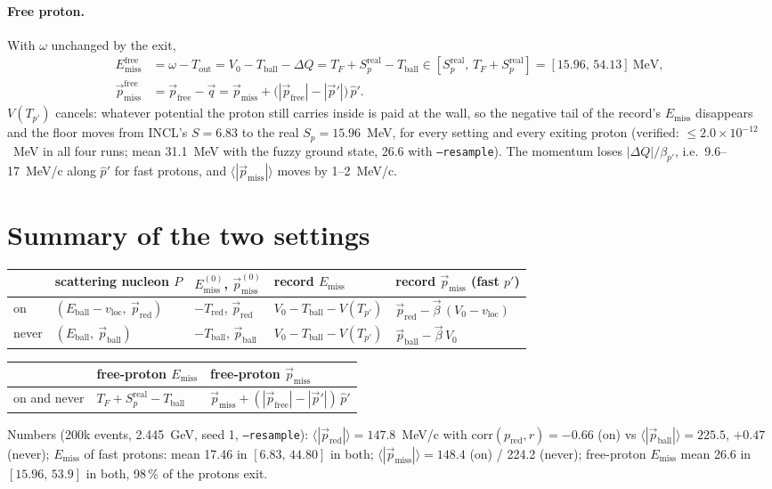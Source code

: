 \documentclass[11pt]{article}
\newcommand{\vv}[1]{\vec{#1}}
\newcommand{\ball}{\mathrm{ball}}
\newcommand{\red}{\mathrm{red}}
\newcommand{\loc}{\mathrm{loc}}
\newcommand{\miss}{\mathrm{miss}}
\newcommand{\TF}{T_F}
\newcommand{\Vz}{V_0}
\newcommand{\code}[1]{\texttt{#1}}
\begin{document}
\paragraph{Free proton.} With $\omega$ unchanged by the exit,
\begin{align*}
E^{\mathrm{free}}_\miss&=\omega-T_{\mathrm{out}}=\Vz-T_\ball-\Delta Q=\TF+S_p^{\mathrm{real}}-T_\ball
\in[S_p^{\mathrm{real}},\,\TF+S_p^{\mathrm{real}}]=[15.96,\,54.13]~\text{MeV},\\
\vv p^{\mathrm{free}}_\miss&=\vv p_{\mathrm{free}}-\vv q=\vv p_\miss+\big(|\vv p_{\mathrm{free}}|-|\vv p'|\big)\,\hat{p}' .
\end{align*}
$V(T_{p'})$ cancels: whatever potential the proton still carries inside is paid at the
wall, so the negative tail of the record's $E_\miss$ disappears and the floor moves from
INCL's $S=6.83$ to the real $S_p=15.96$~MeV, for every setting and every exiting proton
(verified: $\le2.0\times10^{-12}$~MeV in all four runs; mean 31.1~MeV with the fuzzy
ground state, 26.6 with \code{--resample}). The momentum loses $|\Delta Q|/\beta_{p'}$,
i.e.\ 9.6--17~MeV/c along $\hat{p}'$ for fast protons, and $\langle|\vv p_\miss|\rangle$
moves by 1--2~MeV/c.

\section{Summary of the two settings}
\begin{center}
\begin{tabular}{lllll}
\toprule
 & scattering nucleon $P$ & $E^{(0)}_\miss$, $\vv p^{(0)}_\miss$ & record $E_\miss$ & record $\vv p_\miss$ (fast $p'$) \\
\midrule
on & $(E_\ball-v_\loc,\ \vv p_\red)$ & $-T_\red$, $\vv p_\red$ & $\Vz-T_\ball-V(T_{p'})$ & $\vv p_\red-\vv\beta\,(\Vz-v_\loc)$ \\
never & $(E_\ball,\ \vv p_\ball)$ & $-T_\ball$, $\vv p_\ball$ & $\Vz-T_\ball-V(T_{p'})$ & $\vv p_\ball-\vv\beta\,\Vz$ \\
\bottomrule
\end{tabular}
\end{center}
\begin{center}
\begin{tabular}{lll}
\toprule
 & free-proton $E_\miss$ & free-proton $\vv p_\miss$ \\
\midrule
on and never & $\TF+S_p^{\mathrm{real}}-T_\ball$ & $\vv p_\miss+(|\vv p_{\mathrm{free}}|-|\vv p'|)\,\hat{p}'$ \\
\bottomrule
\end{tabular}
\end{center}
Numbers (200k events, 2.445~GeV, seed 1, \code{--resample}):
$\langle|\vv p_\red|\rangle=147.8$~MeV/c with $\mathrm{corr}(p_\red,r)=-0.66$ (on)
vs $\langle|\vv p_\ball|\rangle=225.5$, $+0.47$ (never); $E_\miss$ of fast protons:
mean 17.46 in $[6.83,\,44.80]$ in both; $\langle|\vv p_\miss|\rangle=148.4$ (on) /
224.2 (never); free-proton $E_\miss$ mean 26.6 in $[15.96,\,53.9]$ in both, 98\,\% of the
protons exit.
\end{document}
